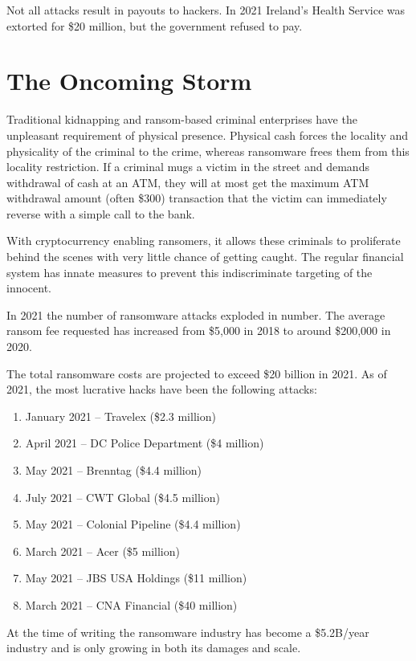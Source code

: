 
Not all attacks result in payouts to hackers. In 2021 Ireland's Health Service
was extorted for \$20 million, but the government refused to pay.

\section{The Oncoming Storm}

Traditional kidnapping and ransom-based criminal enterprises have the unpleasant
requirement of physical presence. Physical cash forces the locality and
physicality of the criminal to the crime, whereas ransomware frees them from
this locality restriction. If a criminal mugs a victim in the street and demands
withdrawal of cash at an ATM, they will at most get the maximum ATM withdrawal
amount (often \$300) transaction that the victim can immediately reverse with a
simple call to the bank.

With cryptocurrency enabling ransomers, it allows these criminals to proliferate
behind the scenes with very little chance of getting caught. The regular
financial system has innate measures to prevent this indiscriminate targeting of
the innocent.

In 2021 the number of ransomware attacks exploded in number. The average ransom
fee requested has increased from \$5,000 in 2018 to around \$200,000 in 2020.

The total ransomware costs are projected to exceed \$20 billion in 2021. As of
2021, the most lucrative hacks have been the following attacks:

\begin{enumerate}
  \item January 2021 -- Travelex (\$2.3 million)
  \item April 2021 -- DC Police Department (\$4 million)
  \item May 2021 -- Brenntag (\$4.4 million)
  \item July 2021 -- CWT Global (\$4.5 million)
  \item May 2021 -- Colonial Pipeline (\$4.4 million)
  \item March 2021 -- Acer (\$5 million)
  \item May 2021 -- JBS USA Holdings (\$11 million)
  \item March 2021 -- CNA Financial (\$40 million)
\end{enumerate}

At the time of writing the ransomware industry has become a \$5.2B/year industry
and is only growing in both its damages and scale.

